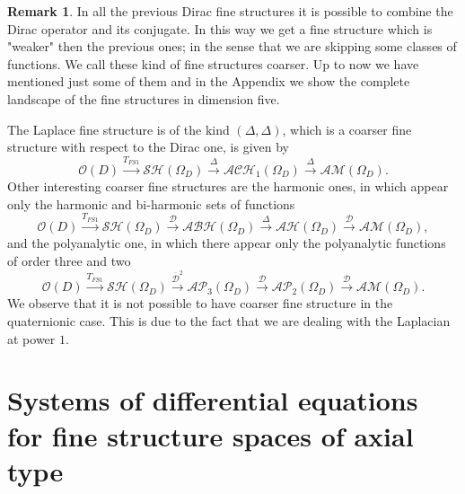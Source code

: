 \documentclass[reqno,11pt]{amsart}
\numberwithin{equation}{section}
\theoremstyle{definition}
\newtheorem{remark}[theorem]{{\bf Remark}}
\begin{document}
\begin{remark}
In all the previous Dirac fine structures it is possible to combine the Dirac operator and its conjugate. In this way we get a fine structure which is "weaker" then the previous ones; in the sense that we are skipping some classes of functions. We call these kind of fine structures coarser. Up to now we have mentioned just some of them and in the Appendix
 we show the complete landscape of the fine structures in dimension five.
\end{remark}

The Laplace fine structure is of the kind $(\Delta, \Delta)$, which is a coarser fine structure with respect to the Dirac one, is given by
$$ \mathcal{O}(D) \overset{T_{FS1}}{\longrightarrow} \mathcal{SH}(\Omega_D)\overset{\Delta}{\longrightarrow}  \mathcal{ACH}_1(\Omega_D) \overset{\Delta}{\longrightarrow}  \mathcal{AM}(\Omega_D).$$
Other interesting coarser fine structures are the harmonic ones, in which appear only the harmonic and
bi-harmonic sets of functions
$$ \mathcal{O}(D) \overset{T_{FS1}}{\longrightarrow} \mathcal{SH}(\Omega_D)\overset{\mathcal{D}}{\longrightarrow}  \mathcal{ABH}(\Omega_D) \overset{\Delta}{\longrightarrow}  \mathcal{AH}(\Omega_D)\overset{\mathcal{D}}{\longrightarrow} \mathcal{AM}(\Omega_D),$$
and the polyanalytic one, in which there appear only the polyanalytic functions of order three and two
$$ \mathcal{O}(D) \overset{T_{FS1}}{\longrightarrow} \mathcal{SH}(\Omega_D)\overset{\mathcal{\overline{D}}^2}{\longrightarrow}  \mathcal{AP}_3(\Omega_D) \overset{\mathcal{D}}{\longrightarrow}  \mathcal{AP}_2(\Omega_D)\overset{\mathcal{D}}{\longrightarrow} \mathcal{AM}(\Omega_D).$$
We observe that it is not possible to have coarser fine structure in the quaternionic case. This is due to the fact that we are dealing with the Laplacian at power $1$.


\section{Systems of differential equations for fine structure spaces of axial type}\label{VEKUA}
\end{document}
